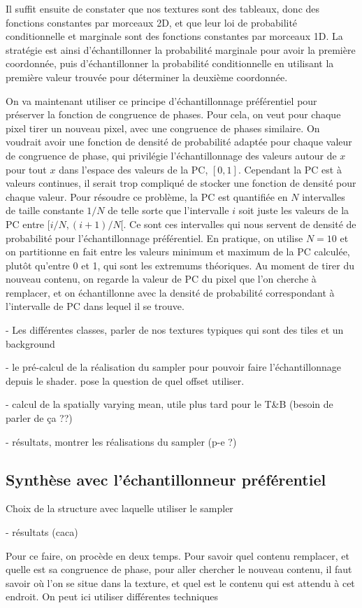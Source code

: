 
Il suffit ensuite de constater que nos textures sont des tableaux, donc des fonctions constantes par morceaux 2D, et que leur loi de probabilité conditionnelle et marginale sont des fonctions constantes par morceaux 1D. La stratégie est ainsi d'échantillonner la probabilité marginale pour avoir la première coordonnée, puis d'échantillonner la probabilité conditionnelle en utilisant la première valeur trouvée pour déterminer la deuxième coordonnée.

On va maintenant utiliser ce principe d'échantillonnage préférentiel pour préserver la fonction de congruence de phases. Pour cela, on veut pour chaque pixel tirer un nouveau pixel, avec une congruence de phases similaire. On voudrait avoir une fonction de densité de probabilité adaptée pour chaque valeur de congruence de phase, qui privilégie l'échantillonnage des valeurs autour de $x$ pour tout $x$ dans l'espace des valeurs de la PC, $[0, 1]$. Cependant la PC est à valeurs continues, il serait trop compliqué de stocker une fonction de densité pour chaque valeur. Pour résoudre ce problème, la PC est quantifiée en $N$ intervalles de taille constante $1/N$ de telle sorte que l'intervalle $i$ soit juste les valeurs de la PC entre $[i/N, (i+1)/N[$. Ce sont ces intervalles qui nous servent de densité de probabilité pour l'échantillonnage préférentiel. En pratique, on utilise $N=10$ et on partitionne en fait entre les valeurs minimum et maximum de la PC calculée, plutôt qu'entre 0 et 1, qui sont les extremums théoriques. Au moment de tirer du nouveau contenu, on regarde la valeur de PC du pixel que l'on cherche à remplacer, et on échantillonne avec la densité de probabilité correspondant à l'intervalle de PC dans lequel il se trouve.


- Les différentes classes, parler de nos textures typiques qui sont des tiles et un background

- le pré-calcul de la réalisation du sampler pour pouvoir faire l'échantillonnage depuis le shader. pose la question de quel offset utiliser.

- calcul de la spatially varying mean, utile plus tard pour le T\&B (besoin de parler de ça ??)

- résultats, montrer les réalisations du sampler (p-e ?)


\subsection{Synthèse avec l'échantillonneur préférentiel}

Choix de la structure avec laquelle utiliser le sampler

- résultats (caca)

Pour ce faire, on procède en deux temps. Pour savoir quel contenu remplacer, et quelle est sa congruence de phase, pour aller chercher le nouveau contenu, il faut savoir où l'on se situe dans la texture, et quel est le contenu qui est attendu à cet endroit. On peut ici utiliser différentes techniques
